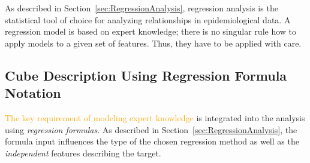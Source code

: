 \documentclass[journal]{style/vgtc} 			          %
\newcommand{\design}[1]{\textcolor{orange}{#1}}
\begin{document}

As described in Section~\ref{sec:RegressionAnalysis}, regression analysis is the statistical tool of choice for analyzing relationships in epidemiological data.
A regression model is based on expert knowledge; there is no singular rule how to apply models to a given set of features. Thus, they have to be applied with care.
\subsection{Cube Description Using Regression Formula Notation}
\design{The key requirement of modeling expert knowledge} is integrated into the analysis using \emph{regression formulas}.
As described in Section~\ref{sec:RegressionAnalysis}, the formula input influences the type of the chosen regression method as well as the \emph{independent} features describing the target.
\end{document}
